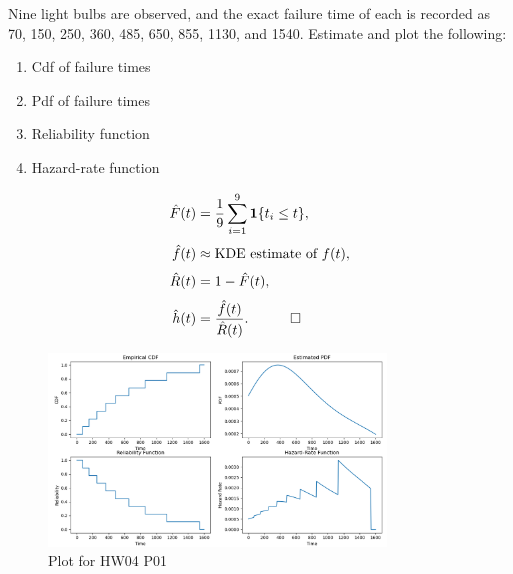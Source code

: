 \begin{hwkProblem}{1}{}

	Nine light bulbs are observed, and the exact failure time of each is recorded as 70, 150, 250, 360, 485, 650, 855, 1130, and 1540. Estimate and plot the following:
	\begin{enumerate}
		\item Cdf of failure times
		\item Pdf of failure times
		\item Reliability function
		\item Hazard-rate function
	\end{enumerate}

	\hwkSol

	\begin{align*}
		\hat{F}(t) &= \frac{1}{9}\sum_{i=1}^{9} \mathbf{1}\{t_i\le t\},\\[1mm]
		\hat{f}(t) &\approx \text{KDE estimate of } f(t),\\[1mm]
		\hat{R}(t) &= 1-\hat{F}(t),\\[1mm]
		\hat{h}(t) &= \frac{\hat{f}(t)}{\hat{R}(t)}. \quad \qed
	\end{align*}

	\begin{figure}[H]
		\begin{center}
			\includegraphics[width=0.8\textwidth]{./images/s01.png}
		\end{center}
		\caption{Plot for HW04 P01}\label{fig:s01}
	\end{figure}
	
	
	\hwkCode

	

\end{hwkProblem}

